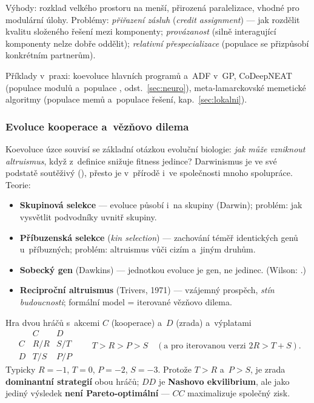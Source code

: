 \documentclass[11pt,a4paper]{article}
\theoremstyle{definition}
\begin{document}
Výhody: rozklad velkého prostoru na menší, přirozená paralelizace, vhodné pro
modulární úlohy. Problémy: \emph{přiřazení zásluh} (\emph{credit assignment}) ---
jak rozdělit kvalitu složeného řešení mezi komponenty; \emph{provázanost}
(silně interagující komponenty nelze dobře oddělit); \emph{relativní
přespecializace} (populace se přizpůsobí konkrétním partnerům).

Příklady v~praxi: koevoluce hlavních programů a~ADF v~GP,
CoDeepNEAT (populace modulů a~populace , odst.~\ref{sec:neuro}),
meta-lamarckovské memetické algoritmy (populace memů a~populace řešení,
kap.~\ref{sec:lokalni}).

\subsubsection{Evoluce kooperace a~vězňovo dilema}

Koevoluce úzce souvisí se základní otázkou evoluční biologie: \emph{jak může
vzniknout altruismus}, když z~definice snižuje fitness jedince?
Darwinismus je ve své podstatě soutěživý (),
přesto je v~přírodě i~ve společnosti mnoho spolupráce. Teorie:
\begin{itemize}
\item \textbf{Skupinová selekce} --- evoluce působí i~na skupiny (Darwin);
  problém: jak vysvětlit podvodníky uvnitř skupiny.
\item \textbf{Příbuzenská selekce} (\emph{kin selection}) --- zachování téměř
  identických genů u~příbuzných; problém: altruismus vůči cizím a~jiným druhům.
\item \textbf{Sobecký gen} (Dawkins) --- jednotkou evoluce je gen, ne jedinec.
  (Wilson: .)
\item \textbf{Reciproční altruismus} (Trivers, 1971) --- vzájemný prospěch,
  \emph{stín budoucnosti}; formální model = iterované vězňovo dilema.
\end{itemize}

\begin{defbox}
Hra dvou hráčů s~akcemi $C$ (kooperace) a~$D$ (zrada) a~výplatami
\[
\begin{array}{c|cc}
 & C & D\\\hline
C & R/R & S/T\\
D & T/S & P/P
\end{array}
\qquad
T > R > P > S \quad (\text{a pro iterovanou verzi } 2R > T+S).
\]
Typicky $R=-1$, $T=0$, $P=-2$, $S=-3$. Protože $T > R$ a~$P > S$, je zrada
\textbf{dominantní strategií} obou hráčů; $DD$ je \textbf{Nashovo
ekvilibrium}, ale jako jediný výsledek \textbf{není Pareto-optimální} ---
$CC$ maximalizuje společný zisk.
\end{defbox}
\end{document}
